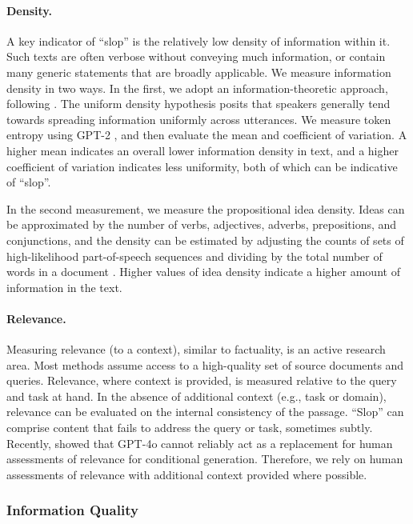 \documentclass{article} %
\begin{document}
\paragraph{Density.}
A key indicator of ``slop'' is the relatively low density of information within it. 
Such texts are often verbose without conveying much information, or contain many generic statements that are broadly applicable.
We measure information density in two ways. 
In the first, we adopt an information-theoretic approach, following \citet{Meister2021RevisitingTU}.
The uniform density hypothesis posits that speakers generally tend towards spreading information uniformly across utterances. 
We measure token entropy using GPT-2 \citep{}, and then evaluate the mean and coefficient of variation. 
A higher mean indicates an overall lower information density in text, and a higher coefficient of variation indicates less uniformity, both of which can be indicative of ``slop''. 

In the second measurement, we measure the propositional idea density.
Ideas can be approximated by the number of verbs, adjectives, adverbs, prepositions, and conjunctions, and the density can be estimated by adjusting the counts of sets of high-likelihood part-of-speech sequences and dividing by the total number of words in a document \cite{Brown2008AutomaticMO}.
Higher values of idea density indicate a higher amount of information in the text. 

\paragraph{Relevance.}
Measuring relevance (to a context), similar to factuality, is an active research area. 
Most methods assume access to a high-quality set of source documents and queries. 
Relevance, where context is provided, is measured relative to the query and task at hand. 
In the absence of additional context (e.g., task or domain), relevance can be evaluated on the internal consistency of the passage. 
``Slop'' can comprise content that fails to address the query or task, sometimes subtly.
Recently, \citet{Clarke2024LLMbasedRA} showed that GPT-4o cannot reliably act as a replacement for human assessments of relevance for conditional generation. 
Therefore, we rely on human assessments of relevance with additional context provided where possible. 

\subsubsection*{\textcolor{infoquality}{Information Quality}}
\end{document}
